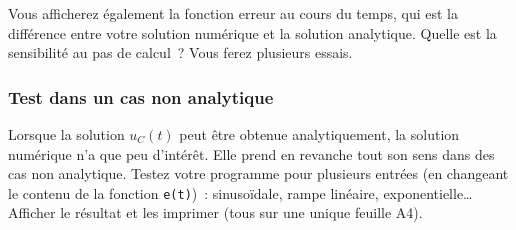 \documentclass[a4paper, 11pt, final, garamond]{book}
\begin{document}

Vous afficherez également la fonction erreur au cours du temps, qui est la
différence entre votre solution numérique et la solution analytique. Quelle est
la sensibilité au pas de calcul~? Vous ferez plusieurs essais.

\subsubsection{Test dans un cas non analytique}

Lorsque la solution $u_{C}(t)$ peut être obtenue analytiquement, la solution
numérique n'a que peu d'intérêt. Elle prend en revanche tout son sens dans des
cas non analytique. Testez votre programme pour plusieurs entrées (en changeant
le contenu de la fonction \texttt{e(t)})~: sinusoïdale, rampe linéaire,
exponentielle… Afficher le résultat et les imprimer (tous sur une unique feuille
A4).
\end{document}
